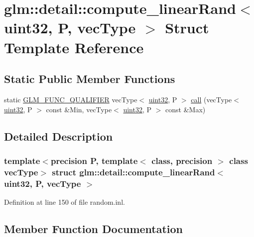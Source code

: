 \hypertarget{structglm_1_1detail_1_1compute__linear_rand_3_01uint32_00_01_p_00_01vec_type_01_4}{}\section{glm\+::detail\+::compute\+\_\+linear\+Rand$<$ uint32, P, vec\+Type $>$ Struct Template Reference}
\label{structglm_1_1detail_1_1compute__linear_rand_3_01uint32_00_01_p_00_01vec_type_01_4}
\subsection*{Static Public Member Functions}
\begin{DoxyCompactItemize}
\item 
static \mbox{\hyperlink{setup_8hpp_a33fdea6f91c5f834105f7415e2a64407}{G\+L\+M\+\_\+\+F\+U\+N\+C\+\_\+\+Q\+U\+A\+L\+I\+F\+I\+ER}} vec\+Type$<$ \mbox{\hyperlink{namespaceglm_1_1detail_ade6cfbf377022aaa391af8cd50489222}{uint32}}, P $>$ \mbox{\hyperlink{structglm_1_1detail_1_1compute__linear_rand_3_01uint32_00_01_p_00_01vec_type_01_4_a94f867cad88b72c723b91fb0f8e7e866}{call}} (vec\+Type$<$ \mbox{\hyperlink{namespaceglm_1_1detail_ade6cfbf377022aaa391af8cd50489222}{uint32}}, P $>$ const \&Min, vec\+Type$<$ \mbox{\hyperlink{namespaceglm_1_1detail_ade6cfbf377022aaa391af8cd50489222}{uint32}}, P $>$ const \&Max)
\end{DoxyCompactItemize}


\subsection{Detailed Description}
\subsubsection*{template$<$precision P, template$<$ class, precision $>$ class vec\+Type$>$\newline
struct glm\+::detail\+::compute\+\_\+linear\+Rand$<$ uint32, P, vec\+Type $>$}



Definition at line 150 of file random.\+inl.



\subsection{Member Function Documentation}
\mbox{\label{structglm_1_1detail_1_1compute__linear_rand_3_01uint32_00_01_p_00_01vec_type_01_4_a94f867cad88b72c723b91fb0f8e7e866}} 
